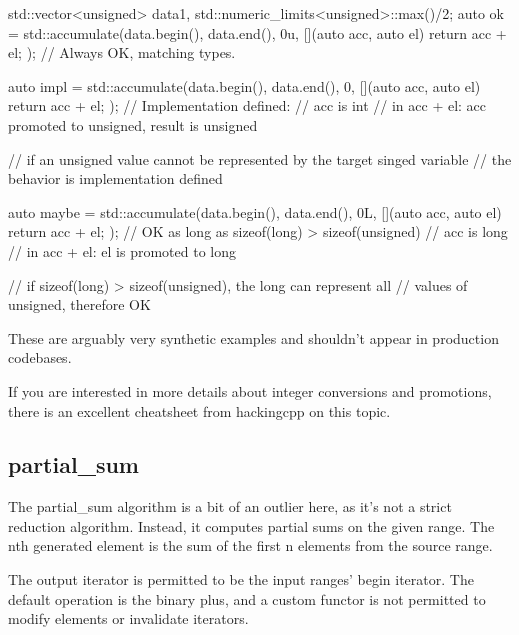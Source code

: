 \begin{box-note}
\begin{cppcode}
std::vector<unsigned> data{1, std::numeric_limits<unsigned>::max()/2};
auto ok = std::accumulate(data.begin(), data.end(), 0u, 
                          [](auto acc, auto el) { return acc + el; });
// Always OK, matching types.

auto impl = std::accumulate(data.begin(), data.end(), 0, 
                            [](auto acc, auto el) { return acc + el; });
// Implementation defined:
// acc is int
// in acc + el: acc promoted to unsigned, result is unsigned

// if an unsigned value cannot be represented by the target singed variable
// the behavior is implementation defined

auto maybe = std::accumulate(data.begin(), data.end(), 0L, 
                             [](auto acc, auto el) { return acc + el; });
// OK as long as sizeof(long) > sizeof(unsigned)
// acc is long
// in acc + el: el is promoted to long

// if sizeof(long) > sizeof(unsigned), the long can represent all 
// values of unsigned, therefore OK
\end{cppcode}
\end{box-note}

These are arguably very synthetic examples and shouldn’t appear in production codebases.

If you are interested in more details about integer conversions and promotions, there is an excellent cheatsheet from hackingcpp on this topic.

\subsection{partial\_sum}

The partial\_sum algorithm is a bit of an outlier here, as it’s not a strict reduction algorithm. Instead, it computes partial sums on the given range. The nth generated element is the sum of the first n elements from the source range.



The output iterator is permitted to be the input ranges’ begin iterator. The default operation is the binary plus, and a custom functor is not permitted to modify elements or invalidate iterators.

